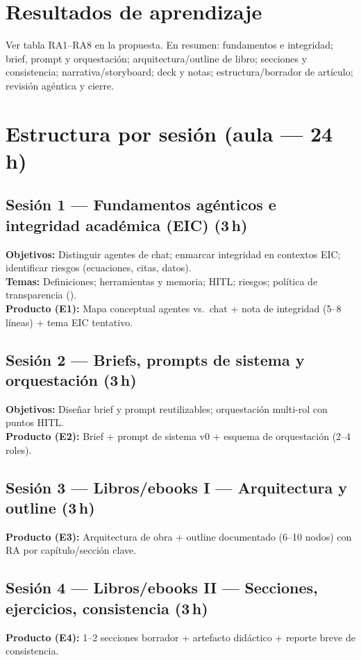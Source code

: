 \section{Resultados de aprendizaje}

Ver tabla RA1--RA8 en la propuesta. En resumen: fundamentos e integridad; brief, prompt y orquestación; arquitectura/outline de libro; secciones y consistencia; narrativa/storyboard; deck y notas; estructura/borrador de artículo; revisión agéntica y cierre.

\section{Estructura por sesión (aula --- 24\,h)}

\subsection{Sesión 1 --- Fundamentos agénticos e integridad académica (EIC) (3\,h)}
\textbf{Objetivos:} Distinguir agentes de chat; enmarcar integridad en contextos EIC; identificar riesgos (ecuaciones, citas, datos).\\
\textbf{Temas:} Definiciones; herramientas y memoria; HITL; riesgos; política de transparencia (\ceddie).\\
\textbf{Producto (E1):} Mapa conceptual agentes vs.\ chat + nota de integridad (5--8 líneas) + tema EIC tentativo.

\subsection{Sesión 2 --- Briefs, prompts de sistema y orquestación (3\,h)}
\textbf{Objetivos:} Diseñar brief y prompt reutilizables; orquestación multi-rol con puntos HITL.\\
\textbf{Producto (E2):} Brief + prompt de sistema v0 + esquema de orquestación (2--4 roles).

\subsection{Sesión 3 --- Libros/ebooks I --- Arquitectura y outline (3\,h)}
\textbf{Producto (E3):} Arquitectura de obra + outline documentado (6--10 nodos) con RA por capítulo/sección clave.

\subsection{Sesión 4 --- Libros/ebooks II --- Secciones, ejercicios, consistencia (3\,h)}
\textbf{Producto (E4):} 1--2 secciones borrador + artefacto didáctico + reporte breve de consistencia.

